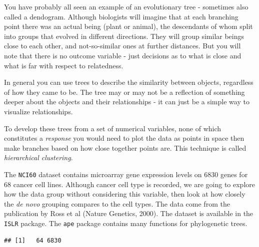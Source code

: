 \documentclass[
]{article}
\newenvironment{Shaded}{\begin{snugshade}}{\end{snugshade}}
\newcommand{\CommentTok}[1]{\textcolor[rgb]{0.56,0.35,0.01}{\textit{#1}}}
\newcommand{\FunctionTok}[1]{\textcolor[rgb]{0.00,0.00,0.00}{#1}}
\newcommand{\NormalTok}[1]{#1}
\newcommand{\OtherTok}[1]{\textcolor[rgb]{0.56,0.35,0.01}{#1}}
\newcommand{\SpecialCharTok}[1]{\textcolor[rgb]{0.00,0.00,0.00}{#1}}
\begin{document}
You have probably all seen an example of an evolutionary tree -
sometimes also called a dendogram. Although biologists will imagine that
at each branching point there was an actual being (plant or animal), the
descendants of whom split into groups that evolved in different
directions. They will group similar beings close to each other, and
not-so-similar ones at further distances. But you will note that there
is no outcome variable - just decisions as to what is close and what is
far with respect to relatedness.

In general you can use trees to describe the similarity between objects,
regardless of how they came to be. The tree may or may not be a
reflection of something deeper about the objects and their relationships
- it can just be a simple way to visualize relationships.

To develop these trees from a set of numerical variables, none of which
constitutes a \emph{response} you would need to plot the data as points
in space then make branches based on how close together points are. This
technique is called \emph{hierarchical clustering}.

The \texttt{NCI60} dataset contains microarray gene expression levels on
6830 genes for 68 cancer cell lines. Although cancer cell type is
recorded, we are going to explore how the data group without considering
this variable, then look at how closely the \emph{de novo} grouping
compares to the cell types. The data come from the publication by Ross
et al (Nature Genetics, 2000). The dataset is available in the
\texttt{ISLR} package. The \texttt{ape} package contains many functions
for phylogenetic trees.

\begin{Shaded}
\end{Shaded}

\begin{verbatim}
## [1]   64 6830
\end{verbatim}
\end{document}
